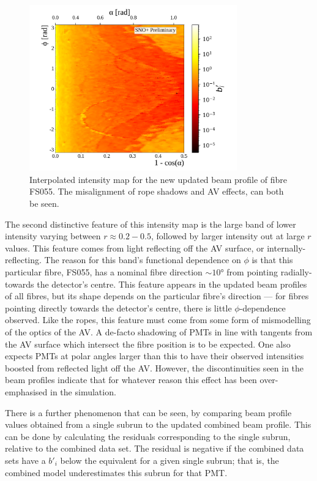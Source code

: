 \begin{figure}
    \centering
    \includegraphics[width=0.8\textwidth]{5_SMELLIESimulation/images/flat_plot_r_FS055_500k_interpolated_beam_profile_full_formatting.png}
    \caption{Interpolated intensity map for the new updated beam profile of fibre FS055. The misalignment of rope shadows and AV effects, can both be seen.}
    \label{fig:updated_beam_profile_sampling}
\end{figure}
The second distinctive feature of this intensity map is the large band of lower intensity varying between $r\approx0.2-0.5$, followed by larger intensity out at large $r$ values. This feature comes from light reflecting off the AV surface, or internally-reflecting. The reason for this band's functional dependence on $\phi$ is that this particular fibre, FS055, has a nominal fibre direction $\sim\ang{10}$ from pointing radially-towards the detector's centre. This feature appears in the updated beam profiles of all fibres, but its shape depends on the particular fibre's direction --- for fibres pointing directly towards the detector's centre, there is little $\phi$-dependence observed. Like the ropes, this feature must come from some form of mismodelling of the optics of the AV. A de-facto shadowing of PMTs in line with tangents from the AV surface which intersect the fibre position is to be expected. One also expects PMTs at polar angles larger than this to have their observed intensities boosted from reflected light off the AV. However, the discontinuities seen in the beam profiles indicate that for whatever reason this effect has been over-emphasised in the simulation.

There is a further phenomenon that can be seen, by comparing beam profile values obtained from a single subrun to the updated combined beam profile. This can be done by calculating the residuals corresponding to the single subrun, relative to the combined data set. The residual is negative if the combined data sets have a $b'_{i}$ below the equivalent for a given single subrun; that is, the combined model underestimates this subrun for that PMT.

